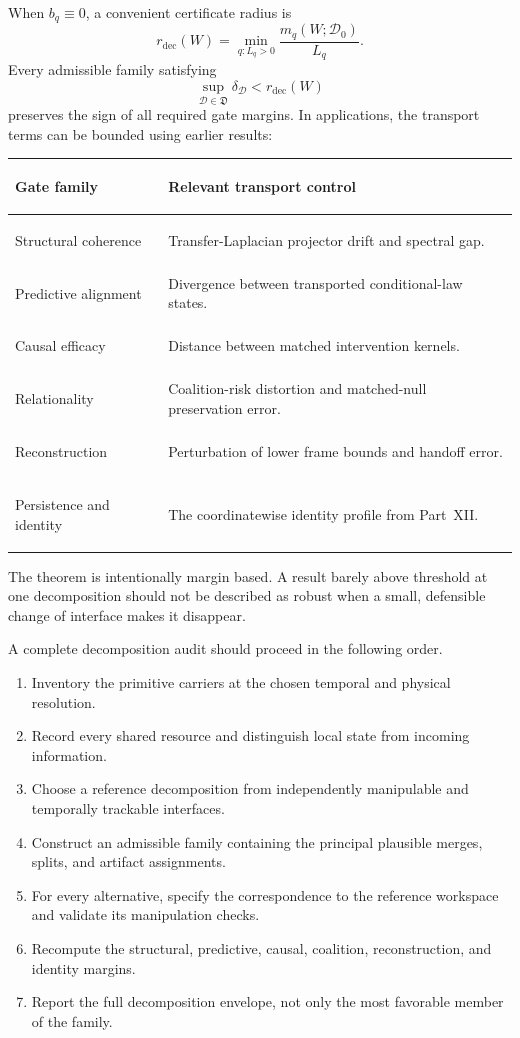 When \(b_q\equiv0\), a convenient certificate radius is
\[
\boxed{
r_{\mathrm{dec}}(W)
=
\min_{q:L_q>0}
\frac{m_q(W;\mathcal D_0)}{L_q}.
}
\]
Every admissible family satisfying
\[
\sup_{\mathcal D\in\mathfrak D}\delta_{\mathcal D}
<
r_{\mathrm{dec}}(W)
\]
preserves the sign of all required gate margins. In applications, the
transport terms can be bounded using earlier results:
\begin{center}
\small
\begin{tabularx}{\textwidth}{@{}>{\bfseries\raggedright\arraybackslash}p{}>{\raggedright\arraybackslash}X@{}}
\toprule
Gate family & Relevant transport control \\
\midrule
Structural coherence & Transfer-Laplacian projector drift and spectral gap. \\
Predictive alignment & Divergence between transported conditional-law states. \\
Causal efficacy & Distance between matched intervention kernels. \\
Relationality & Coalition-risk distortion and matched-null preservation error. \\
Reconstruction & Perturbation of lower frame bounds and handoff error. \\
Persistence and identity & The coordinatewise identity profile from Part~XII. \\
\bottomrule
\end{tabularx}
\end{center}

The theorem is intentionally margin based. A result barely above threshold at
one decomposition should not be described as robust when a small, defensible
change of interface makes it disappear.


A complete decomposition audit should proceed in the following order.
\begin{enumerate}
\item Inventory the primitive carriers at the chosen temporal and physical
 resolution.
\item Record every shared resource and distinguish local state from incoming
 information.
\item Choose a reference decomposition from independently manipulable and
 temporally trackable interfaces.
\item Construct an admissible family containing the principal plausible
 merges, splits, and artifact assignments.
\item For every alternative, specify the correspondence to the reference
 workspace and validate its manipulation checks.
\item Recompute the structural, predictive, causal, coalition, reconstruction,
 and identity margins.
\item Report the full decomposition envelope, not only the most favorable
 member of the family.
\end{enumerate}

